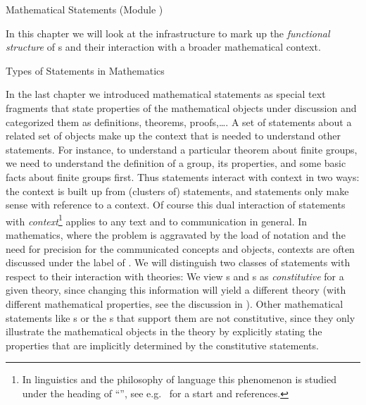 
\begin{omgroup}[short=Mathematical Statements,id=statements]
{Mathematical Statements (Module {})}

  In this chapter we will look at the {\omdoc} infrastructure to mark up the
  {\emph{functional structure}} of {s} and their
  interaction with a broader mathematical context.
  
\begin{omgroup}[id=statements-constitutive]{Types of Statements in Mathematics}
\begin{module}[id=statementtypes]

  In the last chapter we introduced mathematical statements as special text fragments that
  state properties of the mathematical objects under discussion and categorized them as
  definitions, theorems, proofs,\ldots. A set of statements about a related set of objects
  make up the context that is needed to understand other statements.  For instance, to
  understand a particular theorem about finite groups, we need to understand the
  definition of a group, its properties, and some basic facts about finite groups
  first. Thus statements interact with context in two ways: the context is built up from
  (clusters of) statements, and statements only make sense with reference to a context. Of
  course this dual interaction of statements with {\emph{context}}\footnote{In linguistics
    and the philosophy of language this phenomenon is studied under the heading of
    ``{}'', see e.g.~\cite{KamRey:fdtl93}
    for a start and references.}  applies to any text and to communication in general. In
  mathematics, where the problem is aggravated by the load of notation and the need for
  precision for the communicated concepts and objects, contexts are often discussed under
  the label of . We will distinguish
  two classes of statements with respect to their interaction with theories: We view
  {s} and {s} as {\emph{constitutive}} for a given
  theory, since changing this information will yield a different theory (with different
  mathematical properties, see the discussion in {}).  Other
  mathematical statements like {s} or the {s} that
  support them are not constitutive, since they only illustrate the mathematical objects
  in the theory by explicitly stating the properties that are implicitly determined by the
  constitutive statements.
  

\end{module}
\end{omgroup}
\end{omgroup}
